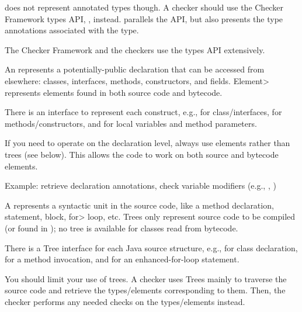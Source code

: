  does not represent annotated types though.  A checker
should use the Checker Framework types API,
, instead.  
parallels the  API, but also presents the type annotations
associated with the type.

The Checker Framework and the checkers use the types API extensively.



An  represents a potentially-public
declaration that can be accessed from elsewhere:  classes, interfaces, methods, constructors, and
fields.  \<Element> represents elements found in both source
code and bytecode.

There is an  interface to represent each construct, e.g.,
 for class/interfaces,  for
methods/constructors, and  for local variables and
method parameters.

If you need to operate on the declaration level, always use elements rather
than trees
(see below).  This allows the code to work on
both source and bytecode elements.

Example: retrieve declaration annotations, check variable
modifiers (e.g., , )



A  represents a syntactic unit in the source code,
like a method declaration, statement, block, \<for> loop, etc. Trees only
represent source code to be compiled (or found in );
no tree is available for classes read from bytecode.

There is a Tree interface for each Java source structure, e.g.,
 for class declaration, 
for a method invocation, and  for an enhanced-for-loop
statement.

You should limit your use of trees. A checker uses Trees mainly to
traverse the source code and retrieve the types/elements corresponding to
them.  Then, the checker performs any needed checks on the types/elements instead.




